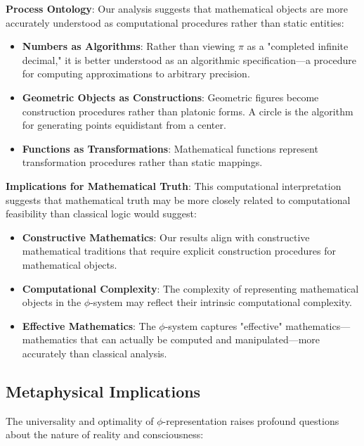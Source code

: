 \documentclass[12pt,letterpaper]{article}
\begin{document}
\textbf{Process Ontology}: Our analysis suggests that mathematical objects are more accurately understood as computational procedures rather than static entities:

\begin{itemize}
\item \textbf{Numbers as Algorithms}: Rather than viewing $\pi$ as a "completed infinite decimal," it is better understood as an algorithmic specification—a procedure for computing approximations to arbitrary precision.

\item \textbf{Geometric Objects as Constructions}: Geometric figures become construction procedures rather than platonic forms. A circle is the algorithm for generating points equidistant from a center.

\item \textbf{Functions as Transformations}: Mathematical functions represent transformation procedures rather than static mappings.
\end{itemize}

\textbf{Implications for Mathematical Truth}: This computational interpretation suggests that mathematical truth may be more closely related to computational feasibility than classical logic would suggest:

\begin{itemize}
\item \textbf{Constructive Mathematics}: Our results align with constructive mathematical traditions that require explicit construction procedures for mathematical objects.

\item \textbf{Computational Complexity}: The complexity of representing mathematical objects in the $\phi$-system may reflect their intrinsic computational complexity.

\item \textbf{Effective Mathematics}: The $\phi$-system captures "effective" mathematics—mathematics that can actually be computed and manipulated—more accurately than classical analysis.
\end{itemize}

\subsection{Metaphysical Implications}

The universality and optimality of $\phi$-representation raises profound questions about the nature of reality and consciousness:
\end{document}
